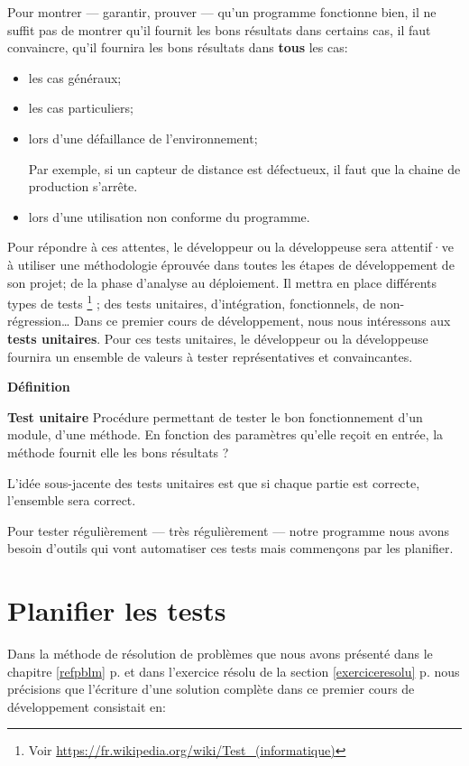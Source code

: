 Pour montrer — garantir, prouver — qu'un programme fonctionne bien, il ne suffit
pas de montrer qu'il fournit les bons résultats dans certains cas, il faut
convaincre, qu'il fournira les bons résultats dans \textbf{tous} les cas:

\begin{itemize}
	\item les cas généraux;
	\item les cas particuliers;
	\item lors d'une défaillance de l'environnement;
		
		Par exemple, si un capteur de distance est défectueux, il faut que la 
		chaine de production s'arrête. 
	
	\item lors d'une utilisation non conforme du programme.
\end{itemize}

Pour répondre à ces attentes, le développeur ou la développeuse sera attentif·ve
à utiliser une méthodologie éprouvée dans toutes les étapes de développement de
son projet; de la phase d'analyse au déploiement.  Il mettra en place différents
types de tests
\footnote{Voir \url{https://fr.wikipedia.org/wiki/Test_(informatique)}}
; des tests unitaires, d'intégration, fonctionnels, de non-régression… Dans ce
premier cours de développement, nous nous intéressons aux \textbf{tests
unitaires}.  Pour ces tests unitaires, le développeur ou la développeuse
fournira un ensemble de valeurs à tester représentatives et convaincantes. 

\textbf{Définition}

\textbf{Test unitaire} Procédure permettant de tester le bon fonctionnement d'un
module, d'une méthode. En fonction des paramètres qu'elle reçoit en entrée, la
méthode fournit elle les bons résultats ? 

L'idée sous-jacente des tests unitaires est que si chaque partie est correcte,
l'ensemble sera correct. 

Pour tester régulièrement — très régulièrement — notre programme nous avons besoin
d'outils qui vont automatiser ces tests mais commençons par les planifier. 


\section{Planifier les tests}

Dans la méthode de résolution de problèmes que nous avons présenté dans le chapitre \ref{refpblm} p.\pageref{refpblm} et dans l'exercice résolu de la section \ref{exerciceresolu} p.\pageref{exerciceresolu} nous précisions que l'écriture d'une solution complète dans ce premier cours de développement consistait en: 

